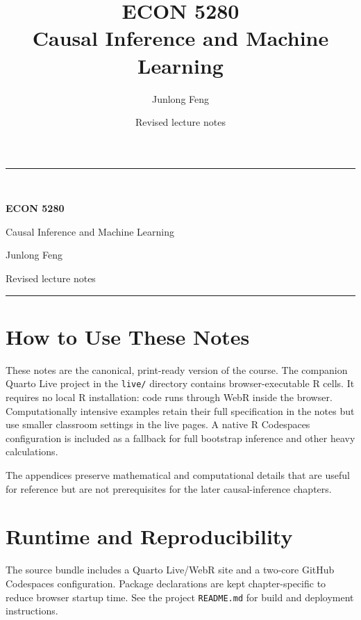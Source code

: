 \documentclass[11pt,oneside,openany]{book}
\title{ECON 5280\\Causal Inference and Machine Learning}
\author{Junlong Feng}
\date{Revised lecture notes}
\begin{document}
\hypersetup{pageanchor=false}
\begin{titlepage}
  \centering
  \vspace*{2.2cm}
  {\color{econblue}\rule{\textwidth}{1.2pt}}\\[1.4cm]
  {\Huge\bfseries ECON 5280\par}
  \vspace{0.45cm}
  {\LARGE Causal Inference and Machine Learning\par}
  \vspace{1.1cm}
  {\Large Junlong Feng\par}
  \vfill
  {\large Revised lecture notes\par}
  \vspace{0.7cm}
  {\color{econblue}\rule{\textwidth}{1.2pt}}
\end{titlepage}
\hypersetup{pageanchor=true}

\frontmatter

\chapter*{How to Use These Notes}
These notes are the canonical, print-ready version of the course. The companion
Quarto Live project in the \texttt{live/} directory contains browser-executable
R cells. It requires no local R installation: code runs through WebR inside the
browser. Computationally intensive examples retain their full specification in
the notes but use smaller classroom settings in the live pages. A native R
Codespaces configuration is included as a fallback for full bootstrap inference
and other heavy calculations.

The appendices preserve mathematical and computational details that are useful
for reference but are not prerequisites for the later causal-inference chapters.

\tableofcontents

\mainmatter












\appendix



\backmatter
\chapter*{Runtime and Reproducibility}
The source bundle includes a Quarto Live/WebR site and a two-core GitHub
Codespaces configuration. Package declarations are kept chapter-specific to
reduce browser startup time. See the project \texttt{README.md} for build and
deployment instructions.
\end{document}
